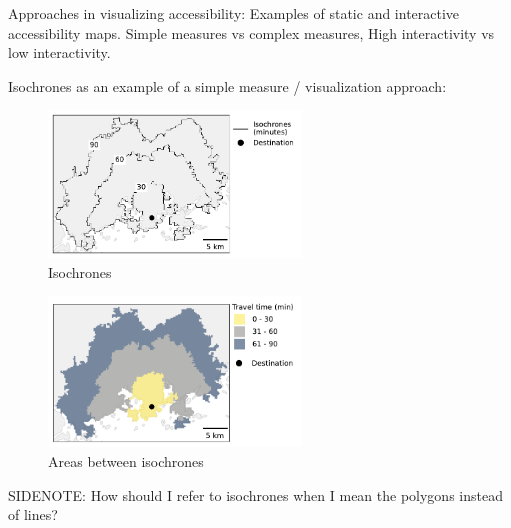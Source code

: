 Approaches in visualizing accessibility:
Examples of static and interactive accessibility maps.
Simple measures vs complex measures,
High interactivity vs low interactivity.

Isochrones as an example of a simple measure / visualization approach:

\begin{figure}[H]
	\centering
	\includegraphics[width=0.6\textwidth]{visual/figures/ttm/isochrone_lines.pdf}
	\caption{Isochrones}
	\label{fig:isochrone lines}
\end{figure}

\begin{figure}[H]
	\centering
	\includegraphics[width=0.6\textwidth]{visual/figures/ttm/isochrone_areas.pdf}
	\caption{Areas between isochrones}
	\label{fig:isochrone areas}
\end{figure}

SIDENOTE: How should I refer to isochrones when I mean the polygons instead of lines?



